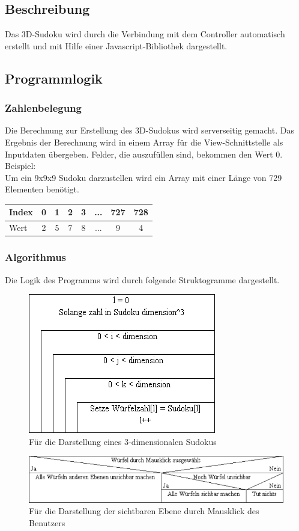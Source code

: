 \documentclass[a4paper,12pt]{scrreprt}
\begin{document}
	\subsection{Beschreibung}
	Das 3D-Sudoku wird durch die Verbindung mit dem Controller automatisch erstellt und mit Hilfe
	einer Javascript-Bibliothek dargestellt.

	\subsection{Programmlogik}
	\subsubsection{Zahlenbelegung}
	Die Berechnung zur Erstellung des 3D-Sudokus wird serverseitig gemacht. Das Ergebnis der
	Berechnung wird in einem Array f\"ur die View-Schnittstelle als Inputdaten \"ubergeben. Felder,
	die auszuf\"ullen sind, bekommen den Wert 0.\medskip \\
	Beispiel:\medskip \\
	Um ein 9x9x9 Sudoku darzustellen wird ein Array mit einer L\"ange von 729 Elementen ben\"otigt.\medskip \\
	\begin{tabular}{l|c|c|c|c|c|c|c}
		\hline
		Index & 0 & 1 & 2 & 3 & ... & 727 & 728 \\
		\hline
		Wert & 2 & 5 & 7 & 8 & ... & 9 & 4 \\
		\hline
	\end{tabular}

	\subsubsection{Algorithmus}
	Die Logik des Programms wird durch folgende Struktogramme dargestellt.
	\begin{figure}[h]
		\includegraphics[scale=0.7]{pictures/Struktogramm1}
		\caption{F\"ur die Darstellung eines 3-dimensionalen Sudokus}
	\end{figure}
	\begin{figure}[h]
		\includegraphics[scale=0.7]{pictures/Struktogramm2}
		\caption{F\"ur die Darstellung der sichtbaren Ebene durch Mausklick des Benutzers}
	\end{figure}
\end{document}
